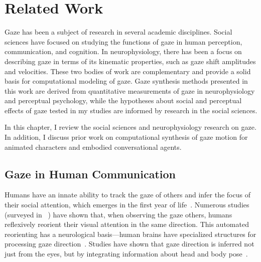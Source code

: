 \pagestyle{deposit}

\chapter{Related Work}

Gaze has been a subject of research in several academic disciplines. Social sciences have focused on studying the functions of gaze in human perception, communication, and cognition. In neurophysiology, there has been a focus on describing gaze in terms of its kinematic properties, such as gaze shift amplitudes and velocities. These two bodies of work are complementary and provide a solid basis for computational modeling of gaze. Gaze synthesis methods presented in this work are derived from quantitative measurements of gaze in neurophysiology and perceptual psychology, while the hypotheses about social and perceptual effects of gaze tested in my studies are informed by research in the social sciences.

In this chapter, I review the social sciences and neurophysiology research on gaze. In addition, I discuss prior work on computational synthesis of gaze motion for animated characters and embodied conversational agents.

\section{Gaze in Human Communication}

Humans have an innate ability to track the gaze of others and infer the focus of their social attention, which emerges in the first year of life~\cite{scaife1975infant,vecera1995detection}. Numerous studies (surveyed in ~\cite{langton2000eyes}) have shown that, when observing the gaze others, humans reflexively reorient their visual attention in the same direction. This automated reorienting has a neurological basis---human brains have specialized structures for processing gaze direction~\cite{emery2000eyes}. Studies have shown that gaze direction is inferred not just from the eyes, but by integrating information about head and body pose~\cite{hietanen1999does,langton2000eyes,hietanen2002social,pomianowska2011socialcues}.

